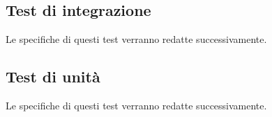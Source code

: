\documentclass[../piano_di_qualifica.tex]{subfiles}
\begin{document}
\subsection{Test di integrazione}%
\label{sub:test_int}
Le specifiche di questi test verranno redatte successivamente.

\subsection{Test di unità}%
\label{sub:test_unit}
Le specifiche di questi test verranno redatte successivamente.
\end{document}
